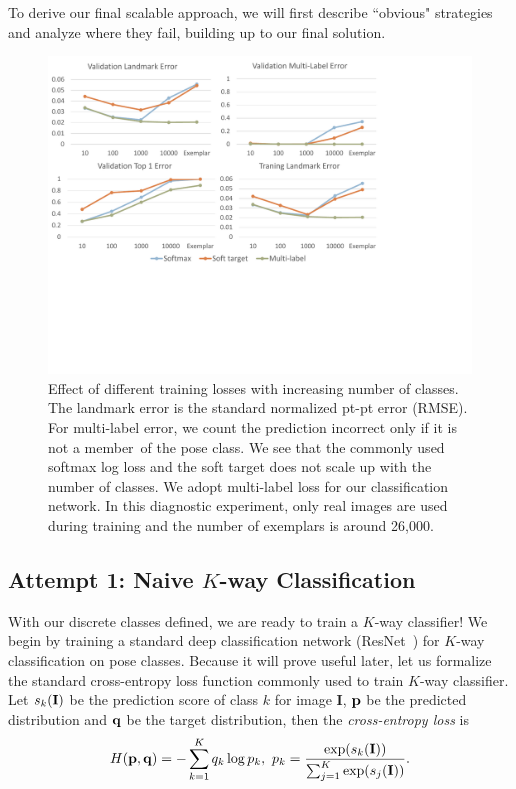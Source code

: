 \documentclass[letterpaper]{article} %
\begin{document}
To derive our final scalable approach, we will first describe ``obvious" strategies and analyze where they fail, building up to our final solution.

\begin{figure}[t!]
\begin{center}
   \includegraphics[width=1\linewidth]{fig/Loss.pdf}
\end{center}
   \caption{Effect of different training losses with increasing number of classes. The landmark error is the standard normalized pt-pt error (RMSE). For multi-label error, we count the prediction incorrect only if it is not a member\ of the pose class. We see that the commonly used softmax log loss and the soft target does not scale up with the number of classes. We adopt multi-label loss for our classification network. In this diagnostic experiment, only real images are used during training and the number of exemplars is around 26,000.}
\label{fig:increasingK}
\end{figure}

\subsection{Attempt 1: Naive $K$-way Classification}

With our discrete classes defined, we are ready to train a $K$-way classifier! We begin by training a standard deep classification network (ResNet~\cite{He2016DeepRL}) for $K$-way classification on pose classes. Because it will prove useful later, let us formalize the standard cross-entropy loss function commonly used to train $K$-way classifier. Let $s_k({\bf I})$ be the prediction score of class $k$ for image {\bf I},  
 ${\bf p}$ be the predicted distribution and ${\bf q}$ be the target distribution, then the {\em cross-entropy loss} is 
\begin{align}
\label{eq:crossentropy}
H({\bf p}, {\bf q}) = -\sum_{k = 1}^{K} q_k \log p_k, \ p_k = \frac{\exp(s_k({\bf I}))}{\sum_{j = 1}^{K}{\exp(s_j({\bf I}))}}.
\end{align}
\end{document}
